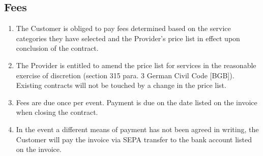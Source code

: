 \documentclass{terms}
\begin{document}
\subsection{Fees}
\begin{enumerate}
\item The Customer is obliged to pay fees determined based on the service categories they have selected and the Provider's price list in effect upon conclusion of the contract.
\item The Provider is entitled to amend the price list for services in the reasonable exercise of discretion (section 315 para. 3 German Civil Code [BGB]).
      Existing contracts will not be touched by a change in the price list.
\item Fees are due once per event.
      Payment is due on the date listed on the invoice when closing the contract.
\item In the event a different means of payment has not been agreed in writing, the Customer will pay the invoice via SEPA transfer to the bank account listed on the invoice.
\end{enumerate}
\end{document}
